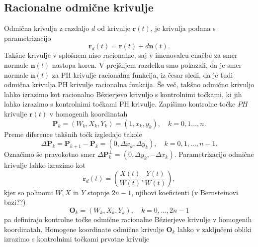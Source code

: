 \documentclass[isrm2, tisk]{fmfdelo}
\begin{document}
    \subsection{Racionalne odmične krivulje}
    Odmična krivulja z razdaljo $d$ od krivulje $\mathbf{r}(t)$, je krivulja podana s parametrizacijo \[\mathbf{r}_d(t)=\mathbf{r}(t) + d\mathbf{n}(t).\]
    Takšne krivulje v splošnem niso racionalne, saj v imenovalcu enačbe za smer normale $\mathbf{n}(t)$ nastopa koren.
    V prejšnjem razdelku smo pokazali, da je smer normale $\mathbf{n}(t)$ za PH krivulje racionalna funkcija, iz česar sledi, da je tudi odmična krivulja PH krivulje racionalna funkcija.
    Še več, takšno odmično krivuljo lahko izrazimo kot racionalno Bézierjevo krivuljo s kontrolnimi točkami, ki jih lahko izrazimo s kontrolnimi točkami PH krivulje.
    Zapišimo kontrolne točke $PH$ krivulje $\mathbf{r}(t)$ v homogenih koordinatah
    \[\mathbf{P}_k = (W_k,X_k,Y_k) = (1,x_k,y_k), \quad k=0,1\ldots,n. \]
    Preme diference takšnih točk izgledajo takole
    \[\Delta\mathbf{P}_k = \mathbf{P}_{k+1}-\mathbf{P}_k = (0,\Delta x_k,\Delta y_k), \quad k=0,1,\ldots,n-1.\]
    Označimo še pravokotno smer $\Delta\mathbf{P}_k^{\perp} =  (0,\Delta y_k, -\Delta x_k)$.
    Parametrizacijo odmične krivulje lahko izrazimo kot
    \[\mathbf{r}_d(t)=\left(\frac{X(t)}{W(t)}, \frac{Y(t)}{W(t)}\right),\]
    kjer so polinomi $W,X$ in $Y$ stopnje $2n-1$, njihovi koeficienti (v Bernsteinovi bazi??)
    \[\mathbf{O}_k=(W_k,X_k,Y_k),\quad k=0,\ldots,2n-1  \]
    pa definirajo kontrolne točke odmične racionalne Bézierjeve krivulje v homogenih koordinatah.
    Homogene koordinate odmične krivulje $\mathbf{O}_k$ lahko v zaključeni obliki izrazimo s kontrolnimi točkami prvotne krivulje
\end{document}
